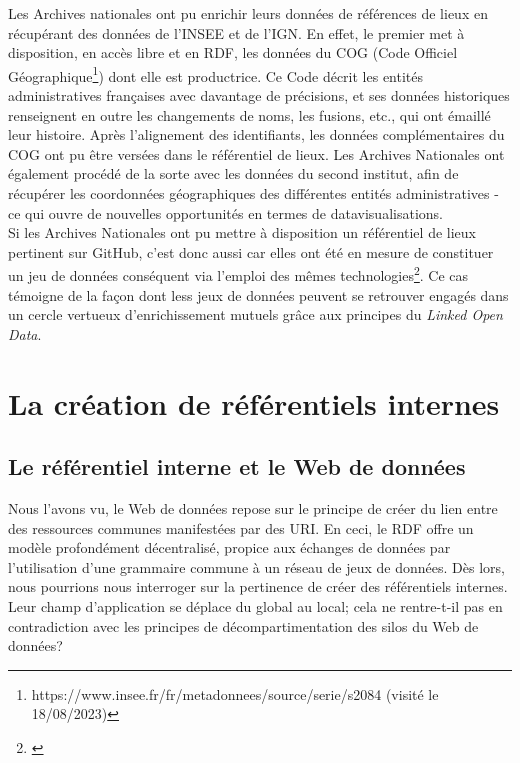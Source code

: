 \documentclass[a4paper,12pt,twoside]{book}
\begin{document}
Les Archives nationales ont pu enrichir leurs données de références de lieux en récupérant des données de l'INSEE et de l'IGN. En effet, le premier met à disposition, en accès libre et en RDF, les données du COG (Code Officiel Géographique\footnote{https://www.insee.fr/fr/metadonnees/source/serie/s2084 (visité le 18/08/2023)}) dont elle est productrice. Ce Code décrit les entités administratives françaises avec davantage de précisions, et ses données historiques renseignent en outre les changements de noms, les fusions, etc., qui ont émaillé leur histoire. Après l'alignement des identifiants, les données complémentaires du COG ont pu être versées dans le référentiel de lieux. Les Archives Nationales ont également procédé de la sorte avec les données du second institut, afin de récupérer les coordonnées géographiques des différentes entités administratives - ce qui ouvre de nouvelles opportunités en termes de datavisualisations.\\

Si les Archives Nationales ont pu mettre à disposition un référentiel de lieux pertinent sur GitHub, c'est donc aussi car elles ont été en mesure de constituer un jeu de données conséquent via l'emploi des mêmes technologies\footnote{\cite[49min:15sec]{clavaudRiCAuxArchives2022}}. Ce cas témoigne de la façon dont less jeux de données peuvent se retrouver engagés dans un cercle vertueux d'enrichissement mutuels grâce aux principes du \textit{Linked Open Data}.





 
\chapter{La création de référentiels internes}


\section{Le référentiel interne et le Web de données}

Nous l'avons vu, le Web de données repose sur le principe de créer du lien entre des ressources communes manifestées par des URI. En ceci, le RDF offre un modèle profondément décentralisé, propice aux échanges de données par l'utilisation d'une grammaire commune à un réseau de jeux de données. Dès lors, nous pourrions nous interroger sur la pertinence de créer des référentiels internes. Leur champ d'application se déplace du global au local; cela ne rentre-t-il pas en contradiction avec les principes de décompartimentation des silos du Web de données?\\
\end{document}
